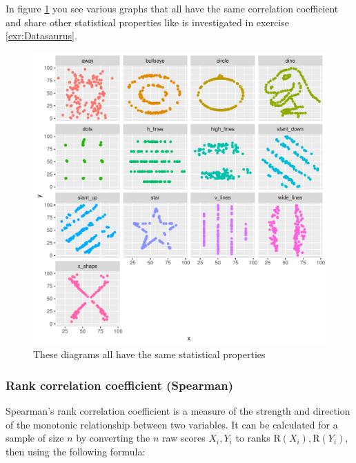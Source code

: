 \documentclass[
  12pt,
  oneside]{book}
\theoremstyle{definition}
\theoremstyle{definition}
\theoremstyle{definition}
\theoremstyle{definition}
\theoremstyle{remark}
\begin{document}
In figure \ref{fig:allcorsame} you see various graphs that all have the same correlation coefficient and share other statistical properties like is investigated in exercise \ref{exr:Datasaurus}.

\begin{figure}

{\centering \includegraphics{fig/allcorsame} 

}

\caption{These diagrams all have the same statistical properties\protect\footnotemark}\label{fig:allcorsame}
\end{figure}

\hypertarget{rank-correlation-coefficient-spearman}{%
\subsubsection{Rank correlation coefficient (Spearman)}\label{rank-correlation-coefficient-spearman}}

Spearman's rank correlation coefficient is a measure of the strength and direction of the monotonic relationship between two variables.
It can be calculated for a sample of size \(n\) by converting the \(n\) raw scores \(X_i, Y_i\) to ranks \(\text{R}(X_i), \text{R}(Y_i)\), then using the following formula:
\end{document}
